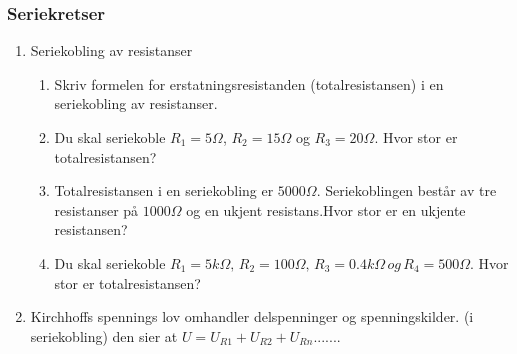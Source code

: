 \documentclass[12pt,a4paper]{article}
\begin{document}
\subsubsection{Seriekretser}
\begin{enumerate}
\item Seriekobling av resistanser

\begin{enumerate}
\item Skriv formelen for erstatningsresistanden (totalresistansen) i en seriekobling av resistanser.
\\
\item Du skal seriekoble $R_{1}=5\Omega$, $R_{2}=15\Omega$ og $R_{3}=20\Omega$. Hvor stor er totalresistansen?
\\
\item Totalresistansen i en seriekobling er $5000\Omega$. Seriekoblingen består av tre resistanser på $1000\Omega$ og en ukjent resistans.Hvor stor er en ukjente resistansen?
\\
\item Du skal seriekoble $R_{1}=5k\Omega,\,R_{2}=100\Omega,\,R_{3}=0.4k\Omega\,og\,R_{4}=500\Omega$. Hvor stor er totalresistansen?
\\
\end{enumerate}
\item Kirchhoffs spennings lov omhandler delspenninger og spenningskilder.
(i seriekobling) den sier at $U=U_{R1}+U_{R2}+U_{Rn}$....... 


\end{enumerate}
\end{document}

